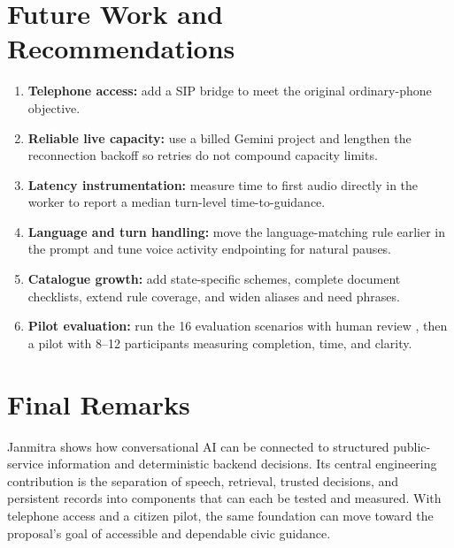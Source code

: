 \documentclass[11pt,a4paper,oneside]{report}
\begin{document}
\section{Future Work and Recommendations}
\begin{enumerate}
  \item \textbf{Telephone access:} add a SIP bridge to meet the original
    ordinary-phone objective.
  \item \textbf{Reliable live capacity:} use a billed Gemini project and lengthen
    the reconnection backoff so retries do not compound capacity limits.
  \item \textbf{Latency instrumentation:} measure time to first audio directly in
    the worker to report a median turn-level time-to-guidance.
  \item \textbf{Language and turn handling:} move the language-matching rule
    earlier in the prompt and tune voice activity endpointing for natural pauses.
  \item \textbf{Catalogue growth:} add state-specific schemes, complete document
    checklists, extend rule coverage, and widen aliases and need phrases.
  \item \textbf{Pilot evaluation:} run the 16 evaluation scenarios with human
    review \cite{evaluation-fixtures}, then a pilot with 8--12 participants
    measuring completion, time, and clarity.
\end{enumerate}

\section{Final Remarks}
Janmitra shows how conversational AI can be connected to structured public-service
information and deterministic backend decisions. Its central engineering
contribution is the separation of speech, retrieval, trusted decisions, and
persistent records into components that can each be tested and measured. With
telephone access and a citizen pilot, the same foundation can move toward the
proposal's goal of accessible and dependable civic guidance.
\end{document}
